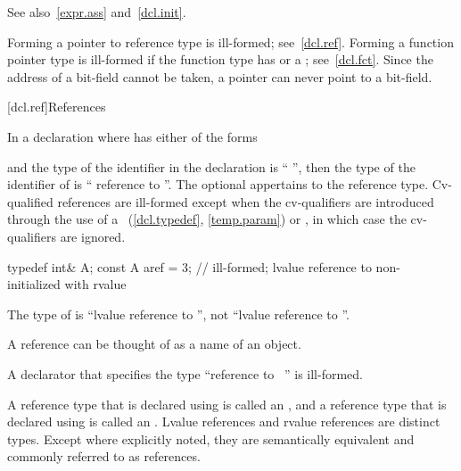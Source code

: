 \pnum
See also~\ref{expr.ass} and~\ref{dcl.init}.

\pnum
\begin{note}
Forming a pointer to reference type is ill-formed; see~\ref{dcl.ref}.
Forming a function pointer type is ill-formed if the function type has
 or a ;
see~\ref{dcl.fct}.
Since the address of a bit-field cannot be taken,
a pointer can never point to a bit-field.
\end{note}

[dcl.ref]{References}%

\pnum
In a declaration
where
has either of the forms

\begin{ncsimplebnf}
\terminal{\&}  \br
\terminal{\&\&}  
\end{ncsimplebnf}

and the type of the identifier in the declaration
is ``
'',
then the type of the identifier of
is `` reference to
''.
The optional  appertains to the reference type.
Cv-qualified references are ill-formed except when the cv-qualifiers
are introduced through the use of a
~(\ref{dcl.typedef}, \ref{temp.param}) or
,
in which case the cv-qualifiers are ignored.
\begin{example}

\begin{codeblock}
typedef int& A;
const A aref = 3;   // ill-formed; lvalue reference to non- initialized with rvalue
\end{codeblock}

The type of
is ``lvalue reference to '',
not ``lvalue reference to ''.
\end{example}
\begin{note}
A reference can be thought of as a name of an object.
\end{note}
%
A declarator that specifies the type
``reference to \cv{}~''
is ill-formed.


\pnum
A reference type that is declared using \tcode{\&} is called an
, and a reference type that
is declared using \tcode{\&\&} is called an
. Lvalue references and
rvalue references are distinct types. Except where explicitly noted, they are
semantically equivalent and commonly referred to as references.

